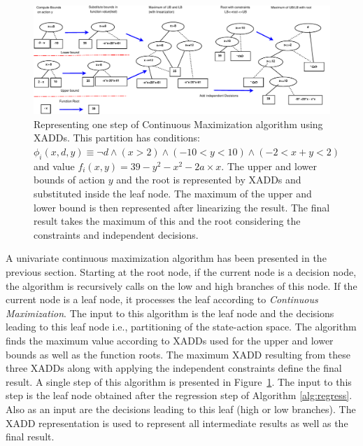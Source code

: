 \documentclass[twoside,11pt]{article}
\begin{document}
\vspace{10mm}
\begin{figure}[t!]
\includegraphics[width=0.97 \textwidth]{Figures2/diagrams/maximum_cont_action4.pdf}

\caption{\footnotesize Representing one step of Continuous Maximization algorithm using XADDs. This partition has conditions: 
$\phi_i ( x,d,y ) \equiv \neg d \wedge ( x>2 ) \wedge ( -10 < y < 10) \wedge ( -2 < x+y < 2 )$  
and value $f_i ( x,y ) = 39- y^2 -x^2 - 2a \times x$. The upper and lower bounds of action $y$ and the root is represented by XADDs and substituted inside the leaf node. The maximum of the upper and lower bound is then represented after linearizing the result. The final result takes the maximum of this and the root considering the constraints and independent decisions.}
\label{fig:xadd_max}
\vspace{-8mm}
\end{figure}
\vspace{-6mm}

A univariate continuous maximization algorithm has been presented in the previous section. 
Starting at the root node, if the current node is a decision node, the algorithm is recursively calls on the low and high branches of this node. If the current node is a leaf node, it processes the leaf according to \emph{Continuous Maximization}. The input to this algorithm is the leaf node and the decisions leading to this leaf node i.e., partitioning of the state-action space. The algorithm finds the maximum value according to XADDs used for the upper and lower bounds as well as the function roots. The maximum XADD resulting from these three XADDs along with applying the independent constraints define the final result. A single step of this algorithm is presented in Figure~\ref{fig:xadd_max}. The input to this step is the leaf node obtained after the regression step of Algorithm \ref{alg:regress}. Also as an input are the decisions leading to this leaf (high or low branches).  The XADD representation is used to represent all intermediate results as well as the final result. 
\end{document}

